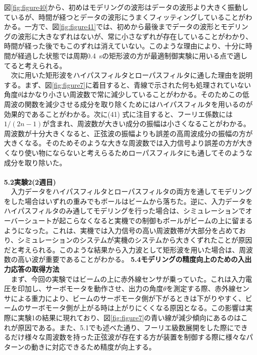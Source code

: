 \documentclass[a4paper,10.5pt]{ltjsarticle}
\begin{document}
図\ref{fig:figure40}から、初めはモデリングの波形はデータの波形より大きく振動しているが、時間が経つとデータの波形にうまくフィッティングしていることがわかる。一方で、図\ref{fig:figure41}では、初めから最後までデータの波形とモデリングの波形に大きなずれはないが、常に小さなずれが存在していることがわかり、時間が経った後でもこのずれは消えていない。このような理由により、十分に時間が経過した状態では周期0.4\ sの矩形波の方が最適制御実験に用いる点で適してると考えられる。\\
　次に用いた矩形波をハイパスフィルタとローパスフィルタに通した理由を説明する。まず、図\ref{fig:figure7}に着目すると、青線で示された何も処理されていない角度$\theta$はかなり小さい周波数で常に減少していることがわかる。そのためこの低周波の関数を減少させる成分を取り除くためにはハイパスフィルタを用いるのが効果的であることがわかる。次に(41) 式に注目すると、フーリエ係数には$1/(2n-1)$が含まれ、周波数が大きい成分の振幅は小さくなることがわかる。周波数が十分大きくなると、正弦波の振幅よりも誤差の高周波成分の振幅の方が大きくなる。そのためそのような大きな周波数では入力信号より誤差の方が大きくなり使い物にならないと考えらるためローパスフィルタにも通してそのような成分を取り除いた。\\
\\
{\large \bfseries 5.2実験2(2週目)}\\
　入力データをハイパスフィルタとローパスフィルタの両方を通してモデリングをした場合はいずれの重みでもボールはビームから落ちた。逆に、入力データをハイパスフィルタのみ通してモデリングを行った場合は、シミュレーションでオーバーシュートが起こらなくなると実機での制御もボールがビームの上に留まるようになった。これは、実機では入力信号の高い周波数帯が大部分を占めており、シミュレーションのシステムが実機のシステムから大きくずれたことが原因だと考えられる。このような結果から入力波として矩形波を用いた場合は、周波数の高い波が重要であることがわかる。
\clearpage
{\large \bfseries 5.4モデリングの精度向上のための入出力応答の取得方法}\\
　まず、今回の実験ではビームの上に赤外線センサが乗っていた。これは入力電圧を印加し、サーボモータを動作させ、出力の角度$\theta$を測定する際、赤外線センサによる重力により、ビームのサーボモータ側が下がるときは下がりやすく、ビームのサーボモータ側が上がる時は上がりにくくなる原因となる。この影響は実際に実験1の結果に現れており、図\ref{fig:figure7}の青い線が減少傾向にあるのはこれが原因である。また、5.1でも述べた通り、フーリエ級数展開をした際にできるだけ様々な周波数を持った正弦波が存在する方が装置を制御する際に様々なパターンの動きに対応できるため精度が向上する。\\
\end{document}
